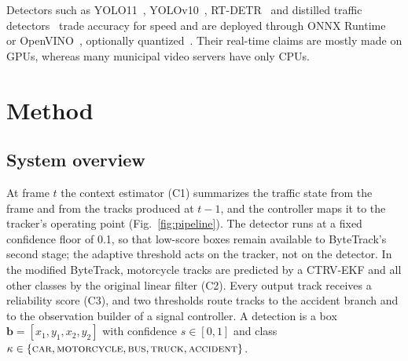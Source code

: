 \documentclass[twocolumn]{svjour3}
\begin{document}
Detectors such as YOLO11~\cite{Jocher2024_yolo11},
YOLOv10~\cite{Wang2024_yolov10}, RT-DETR~\cite{Zhao2024_rtdetr} and distilled
traffic detectors~\cite{An2026_tpdyolo} trade accuracy for speed and are
deployed through ONNX Runtime~\cite{ONNXRuntime} or OpenVINO~\cite{OpenVINO},
optionally quantized~\cite{Jacob2018_quant}. Their real-time claims are mostly
made on GPUs, whereas many municipal video servers have only CPUs.

\section{Method}\label{sec:method}

\subsection{System overview}\label{subsec:overview}

At frame $t$ the context estimator (C1) summarizes the traffic state from the
frame and from the tracks produced at $t-1$, and the controller maps it to the
tracker's operating point (Fig.~\ref{fig:pipeline}). The detector runs at a
fixed confidence floor of 0.1, so that low-score boxes remain available to
ByteTrack's second stage; the adaptive threshold acts on the tracker, not on the
detector. In the modified ByteTrack, motorcycle tracks are predicted by a
CTRV-EKF and all other classes by the original linear filter (C2). Every output
track receives a reliability score (C3), and two thresholds route tracks to the
accident branch and to the observation builder of a signal controller. A
detection is a box $\mathbf{b}=[x_1,y_1,x_2,y_2]$ with confidence $s\in[0,1]$ and
class $\kappa\in\{\textsc{car},\textsc{motorcycle},\textsc{bus},\textsc{truck},\textsc{accident}\}$.
\end{document}
